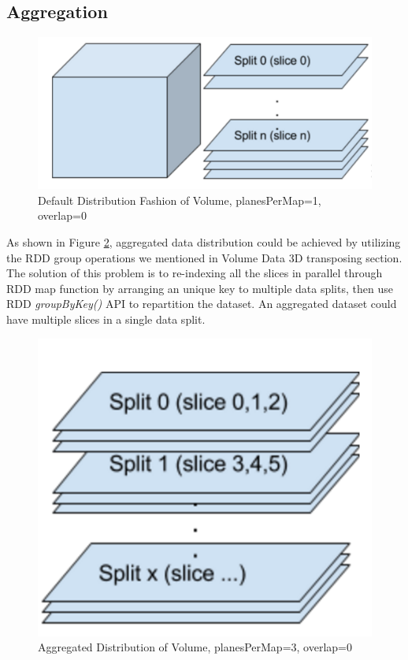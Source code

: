 \subsection{Aggregation}

\begin{figure}[h]
\centering
\includegraphics[scale=0.6]{figures/DefDist.png}
\caption{Default Distribution Fashion of Volume, planesPerMap=1, overlap=0}
\label{DefDist}
\end{figure}

As shown in Figure \ref{Aggregation}, aggregated data distribution could be achieved by utilizing the RDD group operations we mentioned in Volume Data 3D transposing section. The solution of this problem is to re-indexing all the slices in parallel through RDD map function by arranging an unique key to multiple data splits, then use RDD \emph{groupByKey()} API to repartition the dataset. An aggregated dataset could have multiple slices in a single data split.

\begin{figure}[h]
\centering
\includegraphics[scale=0.6]{figures/Aggregation.png}
\caption{Aggregated Distribution of Volume, planesPerMap=3, overlap=0}
\label{Aggregation}
\end{figure}

